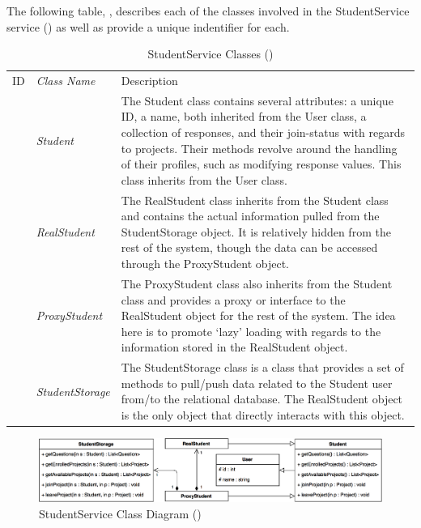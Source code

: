 \documentclass[12pt,letterpaper]{article}
\begin{document}
The following table, , describes each of the classes involved in the StudentService service () as well as provide a unique indentifier for each.

\begin{table}[H]
	\caption{StudentService Classes ()} 
	\begin{tabu} to 
	    \tableheader{}ID & Class Name & Description \\
		 & Student & The Student class contains several attributes: a unique ID, a name, both inherited from the User class, a collection of responses, and their join-status with regards to projects. Their methods revolve around the handling of their profiles, such as modifying response values. This class inherits from the User class. \\
		 & RealStudent & The RealStudent class inherits from the Student class and contains the actual information pulled from the StudentStorage object. It is relatively hidden from the rest of the system, though the data can be accessed through the ProxyStudent object.\\
		 & ProxyStudent & The ProxyStudent class also inherits from the Student class and provides a proxy or interface to the RealStudent object for the rest of the system. The idea here is to promote `lazy' loading with regards to the information stored in the RealStudent object.\\
		 & StudentStorage & The StudentStorage class is a class that provides a set of methods to pull/push data related to the Student user from/to the relational database. The RealStudent object is the only object that directly interacts with this object.\\
	\end{tabu}
\end{table}

\begin{figure}[H]
	\centering{}
	\includegraphics[scale=0.28]{imgs/d3/interfaces/student.png}
	\caption{StudentService Class Diagram ()}
\end{figure}
\end{document}

